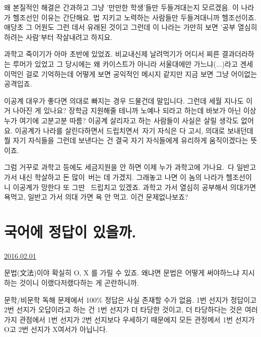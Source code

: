 왜 본질적인 해결은 간과하고 그냥 '만만한 학생'들만 두들겨대는지 모르겠음.
이 나라가 헬조선인 이유는 간단해요. 법 지키고 노력하는 사람들만 두들겨대니까 헬조선이죠. 애당초 그 어원도 그런 데서 유래된 것이고
그런데 이 나라는 가만히 보면 '공부 열심히 하려는 사람'부터 작살내려고 하지요.
\vspace{5mm}

과학고 죽이기가 아마 초반에 있었죠. 비교내신제 날려먹기가 어디서 찌른 결과더라하는 루머가 있었고
그 당시에는 왜 카이스트가 아니라 서울대에만 가느냐(...)라고 겐세이먹인 걸로 기억하는데
어떻게 보면 공익적인 메시지 같지만 지금 보면 그냥 어이없는 공격입죠.
\vspace{5mm}

이공계 대우가 좋다면 의대로 빠지는 경우 드물건데 말입니다. 그런데 세월 지나도 이거 나아진 게 있나요?
장학금 지원해줄 테니까 노예나 되라고 하는데 바보가 아닌 이상 누가 여기에 고분고분 따름?
이공계 살리자고 하는 사람들이 사실은 살릴 생각도 없어요. 이공계가 나라를 살린다하면서 드립치면서 자기 자식은 다 고시, 의대로 보내던데 뭘
자기 자식들을 그런데 보낸다는 건 결국 자기 자식들에게 유리하게 움직이겠다는 뜻이죠.
\vspace{5mm}

그럼 거꾸로 과학고 등에도 세금지원을 안 하면 이제 누가 과학고에 가나요. 다 일반고 가서 내신 학살하고 돈 많이 버는 데 가겠지.
그래놓고 나면 이 놈의 나라가 헬조선이니 이공계가 망한다 또 그딴  드립치고 있겠죠.
과학고 가서 열심히 공부해서 의대가면 욕먹고, 일반고 가서 의대 가면 욕 안 먹고. 이건 문제없나보죠?
\vspace{5mm}



\section{국어에 정답이 있을까.}
\href{https://www.kockoc.com/Apoc/619599}{2016.02.01}

\vspace{5mm}

문법(文法)이야 확실히 O, X 를 가릴 수 있죠.
왜냐면 문법은 어떻게 써야하느냐 지시하는 것이니 이랬다저랬다하는 게 곤란하니까.
\vspace{5mm}

문학/비문학 독해 문제에서 100$\%$ 정답은 사실 존재할 수가 없음.
1번 선지가 정답이고 2번 선지가 오답이라고 하는 건 1번 선지가 더 타당한 것이고,
더 타당하다는 것은 여러가지 관점에서 1번 선지가 2번 선지보다 우세하기 때문에지
모든 관정메서 1번 선지가 O고 2번 선지가 X여서가 아닙니다.
\vspace{5mm}

